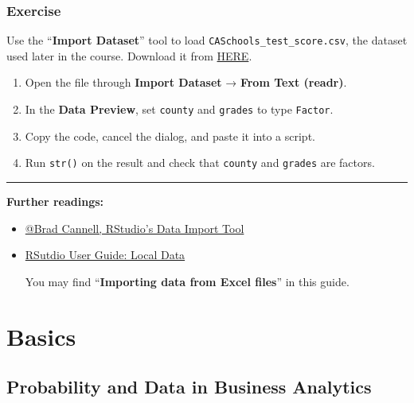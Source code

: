 \documentclass[
  12pt,
  a4paper,
]{scrbook}
\providecommand{\tightlist}{%
  \setlength{\itemsep}{0pt}\setlength{\parskip}{0pt}}
\renewcommand{\tightlist}{\setlength{\itemsep}{0.5\baselineskip}\setlength{\parskip}{0.2\baselineskip}}
\theoremstyle{plain}
\theoremstyle{definition}
\theoremstyle{remark}
\begin{document}
\section{Exercise}\label{exercise-1}

Use the ``\textbf{Import Dataset}'' tool to load
\texttt{CASchools\_test\_score.csv}, the dataset used later in the
course. Download it from \href{data/CASchools_test_score.csv}{HERE}.

\begin{enumerate}
\def\labelenumi{\arabic{enumi}.}
\tightlist
\item
  Open the file through \textbf{Import Dataset} → \textbf{From Text
  (readr)}.
\item
  In the \textbf{Data Preview}, set \texttt{county} and \texttt{grades}
  to type \texttt{Factor}.
\item
  Copy the code, cancel the dialog, and paste it into a script.
\item
  Run \texttt{str()} on the result and check that \texttt{county} and
  \texttt{grades} are factors.
\end{enumerate}

\begin{center}\rule{0.5\linewidth}{0.5pt}\end{center}

\textbf{Further readings:}

\begin{itemize}
\item
  \href{https://www.r4epi.com/chapters/rstudio_import_tool/rstudio_import_tool}{@Brad
  Cannell, RStudio's Data Import Tool}
\item
  \href{https://docs.posit.co/ide/user/ide/guide/data/data-local.html}{RSutdio
  User Guide: Local Data}

  You may find ``\textbf{Importing data from Excel files}'' in this
  guide.
\end{itemize}

\part{Basics}

\chapter{Probability and Data in Business
Analytics}\label{probability-and-data-in-business-analytics}
\end{document}

